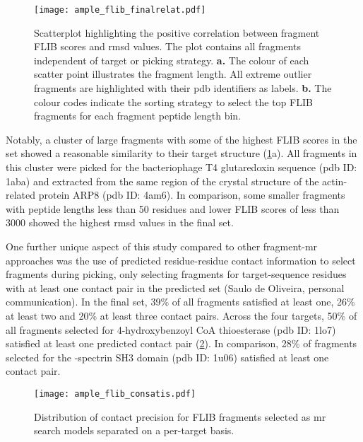 \begin{figure}[H]
	\centering
	\texttt{[image: ample\_flib\_finalrelat.pdf]}
        \caption[Correlation analysis for FLIB MR fragments]{Scatterplot highlighting the positive correlation between fragment FLIB scores and \gls{rmsd} values. The plot contains all fragments independent of target or picking strategy. \textbf{a.} The colour of each scatter point illustrates the fragment length. All extreme outlier fragments are highlighted with their \gls{pdb} identifiers as labels. \textbf{b.} The colour codes indicate the sorting strategy to select the top FLIB fragments for each fragment peptide length bin.}
	\label{fig:ample_flib_finalrelat}
\end{figure}

Notably, a cluster of large fragments with some of the highest FLIB scores in the set showed a reasonable similarity to their target structure (\cref{fig:ample_flib_finalrelat}a). All fragments in this cluster were picked for the bacteriophage T4 glutaredoxin sequence (\gls{pdb} ID: 1aba) and extracted from the same region of the crystal structure of the actin-related protein ARP8 (\gls{pdb} ID: 4am6). In comparison, some smaller fragments with peptide lengths less than 50 residues and lower FLIB scores of less than 3000 showed the highest \gls{rmsd} values in the final set.

One further unique aspect of this study compared to other fragment-\gls{mr} approaches was the use of predicted residue-residue contact information to select fragments during picking, only selecting fragments for target-sequence residues with at least one contact pair in the predicted set (Saulo de Oliveira, personal communication). In the final set, 39\% of all fragments satisfied at least one, 26\% at least two and 20\% at least three contact pairs. Across the four targets, 50\% of all fragments selected for 4-hydroxybenzoyl CoA thioesterase (\gls{pdb} ID: 1lo7) satisfied at least one predicted contact pair (\cref{fig:ample_flib_consatis}). In comparison, 28\% of fragments selected for the \textalpha-spectrin SH3 domain (\gls{pdb} ID: 1u06) satisfied at least one contact pair.

\begin{figure}[H]
	\centering
	\texttt{[image: ample\_flib\_consatis.pdf]}
	\caption[Distribution of contact precision for FLIB fragments]{Distribution of contact precision for FLIB fragments selected as \gls{mr} search models separated on a per-target basis.}
	\label{fig:ample_flib_consatis}
\end{figure}


